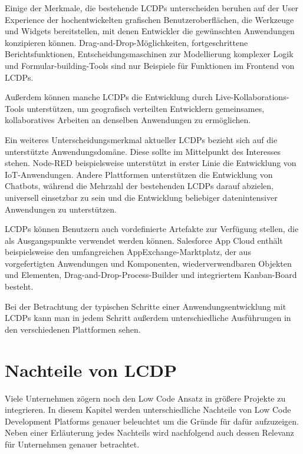 \documentclass[12pt]{article} %
\begin{document}
	Einige der Merkmale, die bestehende LCDPs unterscheiden beruhen auf der User Experience der hochentwickelten grafischen Benutzeroberflächen, die Werkzeuge und Widgets bereitstellen, mit denen Entwickler die gewünschten Anwendungen konzipieren können. Drag-and-Drop-Möglichkeiten, fortgeschrittene Berichtsfunktionen, Entscheidungsmaschinen zur Modellierung komplexer Logik und Formular-building-Tools sind nur Beispiele für Funktionen im Frontend von LCDPs. \cite{DiRuscio.2022}
	
	Außerdem können manche LCDPs die Entwicklung durch Live-Kollaborations-Tools unterstützen, um geografisch verteilten Entwicklern gemeinsames, kollaboratives Arbeiten an denselben Anwendungen zu ermöglichen. \cite{DiRuscio.2022}
	
	Ein weiteres Unterscheidungsmerkmal aktueller LCDPs bezieht sich auf die unterstützte Anwendungsdomäne. Diese sollte im Mittelpunkt des Interesses stehen. Node-RED beispielsweise unterstützt in erster Linie die Entwicklung von IoT-Anwendungen. Andere Plattformen unterstützen die Entwicklung von Chatbots, während die Mehrzahl der bestehenden LCDPs darauf abzielen, universell einsetzbar zu sein und die Entwicklung beliebiger datenintensiver Anwendungen zu unterstützen. \cite{DiRuscio.2022}
	
	LCDPs können Benutzern auch vordefinierte Artefakte zur Verfügung stellen, die als Ausgangspunkte verwendet werden können. Salesforce App Cloud enthält beispielsweise den umfangreichen AppExchange-Marktplatz, der aus vorgefertigten Anwendungen und Komponenten, wiederverwendbaren Objekten und Elementen, Drag-and-Drop-Process-Builder und integriertem Kanban-Board besteht. \cite{DiRuscio.2022}
	
	Bei der Betrachtung der typischen Schritte einer Anwendungsentwicklung mit LCDPs kann man in jedem Schritt außerdem unterschiedliche Ausführungen in den verschiedenen Plattformen sehen. 
	
	\section{Nachteile von LCDP}
	Viele Unternehmen zögern noch den Low Code Ansatz in größere Projekte zu integrieren. %
	In diesem Kapitel werden unterschiedliche Nachteile von Low Code Development Platforms genauer beleuchtet um die Gründe für dafür aufzuzeigen. Neben einer Erläuterung jedes Nachteils wird nachfolgend auch dessen Relevanz für Unternehmen genauer betrachtet. %
		
\end{document}
